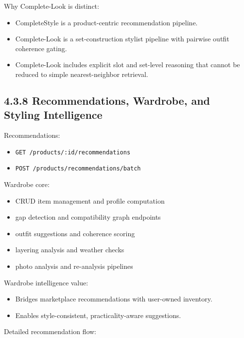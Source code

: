 \documentclass[12pt,a4paper]{report}
\begin{document}
Why Complete-Look is distinct:

\begin{itemize}
\item CompleteStyle is a product-centric recommendation pipeline.
\item Complete-Look is a set-construction stylist pipeline with pairwise outfit coherence gating.
\item Complete-Look includes explicit slot and set-level reasoning that cannot be reduced to simple nearest-neighbor retrieval.
\end{itemize}

\subsection{4.3.8 Recommendations, Wardrobe, and Styling Intelligence}
Recommendations:

\begin{itemize}
\item \texttt{GET /products/:id/recommendations}
\item \texttt{POST /products/recommendations/batch}
\end{itemize}

Wardrobe core:

\begin{itemize}
\item CRUD item management and profile computation
\item gap detection and compatibility graph endpoints
\item outfit suggestions and coherence scoring
\item layering analysis and weather checks
\item photo analysis and re-analysis pipelines
\end{itemize}

Wardrobe intelligence value:

\begin{itemize}
\item Bridges marketplace recommendations with user-owned inventory.
\item Enables style-consistent, practicality-aware suggestions.
\end{itemize}

Detailed recommendation flow:
\end{document}
